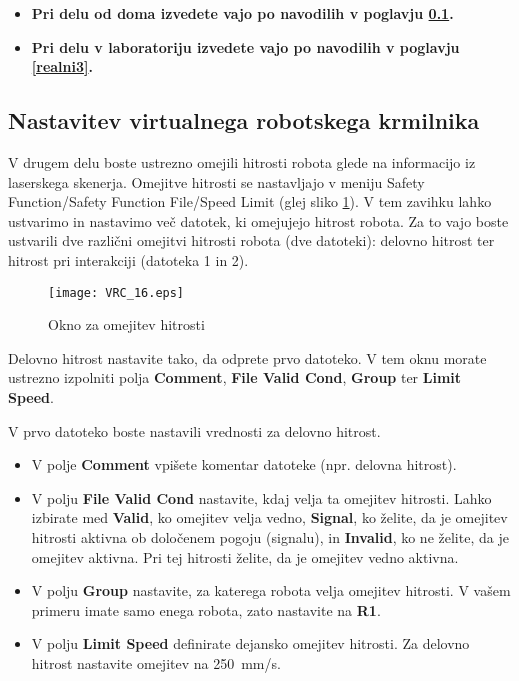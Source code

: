 \begin{mdframed}[backgroundcolor=red!20, shadow=true,roundcorner=8pt]
	\begin{itemize}
		\item \textbf{Pri delu od doma izvedete vajo po navodilih v poglavju \ref{sim3}.}
		\item \textbf{Pri delu v laboratoriju izvedete vajo po navodilih v poglavju \ref{realni3}.}		
	\end{itemize}
\end{mdframed}

\subsection{Nastavitev virtualnega robotskega krmilnika} \label{sim3}

V drugem delu boste ustrezno omejili hitrosti robota glede na informacijo iz laserskega skenerja. Omejitve hitrosti se nastavljajo v meniju Safety Function/Safety Function File/Speed Limit (glej sliko \ref{fig:VRC_16}).  V tem zavihku lahko ustvarimo in nastavimo več datotek, ki omejujejo hitrost robota. Za to vajo boste ustvarili dve različni omejitvi hitrosti robota (dve datoteki): delovno hitrost ter hitrost pri interakciji (datoteka 1 in 2).


\begin{figure}[hbt]
	\centering
	\texttt{[image: VRC\_16.eps]}
	\caption{Okno za omejitev hitrosti}
	\label{fig:VRC_16}
\end{figure}

Delovno hitrost nastavite tako, da odprete prvo datoteko. V tem oknu morate ustrezno izpolniti polja \textbf{Comment}, \textbf{File Valid Cond}, \textbf{Group} ter \textbf{Limit Speed}.

V prvo datoteko boste nastavili vrednosti za delovno hitrost.

\begin{itemize}
	\item V polje \textbf{Comment} vpišete komentar datoteke (npr. delovna hitrost).
	\item V polju \textbf{File Valid Cond} nastavite, kdaj velja ta omejitev hitrosti. Lahko izbirate med \textbf{Valid}, ko omejitev velja vedno, \textbf{Signal}, ko želite, da je omejitev hitrosti aktivna ob določenem pogoju (signalu), in {\textbf{Invalid}}, ko ne želite, da je omejitev aktivna. Pri tej hitrosti želite, da je omejitev vedno aktivna.
	\item V polju \textbf{Group} nastavite, za katerega robota velja omejitev hitrosti. V vašem primeru imate samo enega robota, zato nastavite na \textbf{R1}.
	\item V polju \textbf{Limit Speed} definirate dejansko omejitev hitrosti. Za delovno hitrost nastavite omejitev na 250~mm/s.
\end{itemize}

